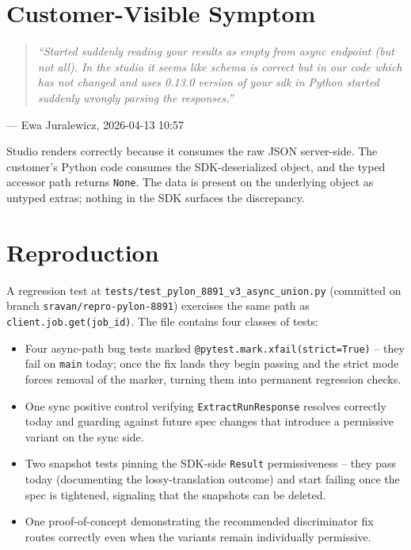 \documentclass[11pt]{article}
\begin{document}
\section{Customer-Visible Symptom}

\begin{quote}\itshape
``Started suddenly reading your results as empty from async endpoint (but not all). In the studio it seems like schema is correct but in our code which has not changed and uses 0.13.0 version of your sdk in Python started suddenly wrongly parsing the responses.''
\end{quote}
\hfill --- Ewa Juralewicz, 2026-04-13 10:57

Studio renders correctly because it consumes the raw JSON server-side. The customer's Python code consumes the SDK-deserialized object, and the typed accessor path returns \texttt{None}. The data is present on the underlying object as untyped extras; nothing in the SDK surfaces the discrepancy.

\section{Reproduction}

A regression test at \texttt{tests/test\_pylon\_8891\_v3\_async\_union.py} (committed on branch \texttt{sravan/repro-pylon-8891}) exercises the same path as \texttt{client.job.get(job\_id)}. The file contains four classes of tests:
\begin{itemize}
  \item Four async-path bug tests marked \texttt{@pytest.mark.xfail(strict=True)} -- they fail on \texttt{main} today; once the fix lands they begin passing and the strict mode forces removal of the marker, turning them into permanent regression checks.
  \item One sync positive control verifying \texttt{ExtractRunResponse} resolves correctly today and guarding against future spec changes that introduce a permissive variant on the sync side.
  \item Two snapshot tests pinning the SDK-side \texttt{Result} permissiveness -- they pass today (documenting the lossy-translation outcome) and start failing once the spec is tightened, signaling that the snapshots can be deleted.
  \item One proof-of-concept demonstrating the recommended discriminator fix routes correctly even when the variants remain individually permissive.
\end{itemize}
\end{document}
